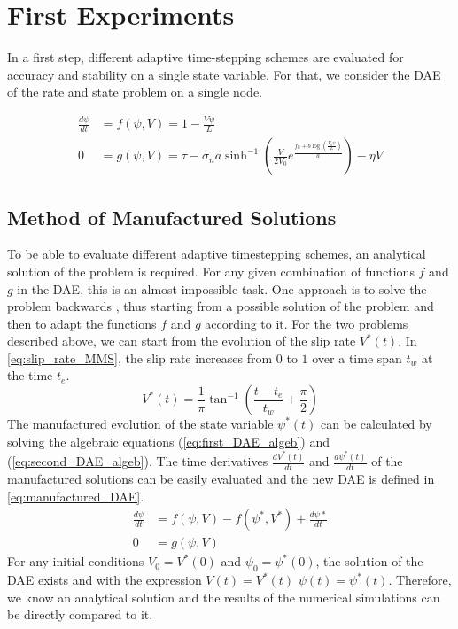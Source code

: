 

\chapter{First Experiments}
In a first step, different adaptive time-stepping schemes are evaluated for accuracy and stability on a single state variable. For that, we consider the DAE of the rate and state problem on a single node.  
    

\begin{align}
    \label{eq:first_DAE_ODE}
    \frac{d\psi}{dt} &= f(\psi,V) = 1 - \frac{V\psi}{L} \\
    \label{eq:first_DAE_algeb}
    0 &= g(\psi,V) = \tau - \sigma_na\sinh^{-1}\left(\frac{V}{2V_0}e^{\frac{f_0 + b\log\left(\frac{V_0\psi}{L}\right)}{a}}\right)-\eta V
\end{align}

\section{Method of Manufactured Solutions}
To be able to evaluate different adaptive timestepping schemes, an analytical solution of the problem is required. For any given combination of functions $f$ and $g$ in the DAE, this is an almost impossible task. One approach is to solve the problem backwards \cite{10.1115/1.1436090}, thus starting from a possible solution of the problem and then to adapt the functions $f$ and $g$ according to it. For the two problems described above, we can start from the evolution of the slip rate $V^*(t)$. In \autoref{eq:slip_rate_MMS}, the slip rate increases from $0$ to $1$ over a time span $t_w$ at the time $t_e$.
\begin{equation}  
    \label{eq:slip_rate_MMS}
    V^*(t) = \frac{1}{\pi}\tan^{-1}\left(\frac{t-t_e}{t_w} + \frac{\pi}{2}\right)
\end{equation}
The manufactured evolution of the state variable $\psi^*(t)$ can be calculated by solving the algebraic equations (\ref{eq:first_DAE_algeb}) and (\ref{eq:second_DAE_algeb}). The time derivatives $\frac{dV^*(t)}{dt}$ and $\frac{d\psi^*(t)}{dt}$ of the manufactured solutions can be easily evaluated and the new DAE is defined in \autoref{eq:manufactured_DAE}.
\begin{align}
    \label{eq:manufactured_DAE}
    \frac{d\psi}{dt} &= f(\psi,V) - f(\psi^*,V^*) + \frac{d\psi*}{dt} \\
    0 &= g(\psi, V) 
\end{align}
For any initial conditions $V_0 = V^*(0)$ and $\psi_0 = \psi^*(0)$, the solution of the DAE exists and with the expression $V(t) = V^*(t)$ $\psi(t) = \psi^*(t)$. Therefore, we know an analytical solution and the results of the numerical simulations can be directly compared to it. 

